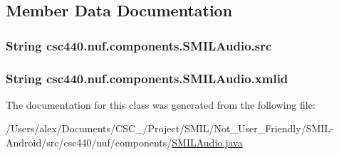 \subsection{Member Data Documentation}
\hypertarget{classcsc440_1_1nuf_1_1components_1_1_s_m_i_l_audio_a482173b3a842129f333212e31827bbba}{
\subsubsection[{src}]{\setlength{\rightskip}{0pt plus 5cm}String {\bf csc440.\-nuf.\-components.\-S\-M\-I\-L\-Audio.\-src}}}\label{classcsc440_1_1nuf_1_1components_1_1_s_m_i_l_audio_a482173b3a842129f333212e31827bbba}
\hypertarget{classcsc440_1_1nuf_1_1components_1_1_s_m_i_l_audio_a6e5d5517217155497b83ec5f9cab8f53}{
\subsubsection[{xmlid}]{\setlength{\rightskip}{0pt plus 5cm}String {\bf csc440.\-nuf.\-components.\-S\-M\-I\-L\-Audio.\-xmlid}}}\label{classcsc440_1_1nuf_1_1components_1_1_s_m_i_l_audio_a6e5d5517217155497b83ec5f9cab8f53}


The documentation for this class was generated from the following file\-:\begin{DoxyCompactItemize}
\item 
/\-Users/alex/\-Documents/\-C\-S\-C\-\_/\-Project/\-S\-M\-I\-L/\-Not\-\_\-\-User\-\_\-\-Friendly/\-S\-M\-I\-L-\/\-Android/src/csc440/nuf/components/\hyperlink{_s_m_i_l_audio_8java}{S\-M\-I\-L\-Audio.\-java}\end{DoxyCompactItemize}
